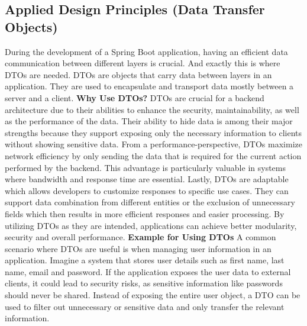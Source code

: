     \subsection{Applied Design Principles (Data Transfer Objects)}
    During the development of a Spring Boot application, having an efficient data communication between different layers is crucial. And exactly this is where DTOs are needed. \newline
    DTOs are objects that carry data between layers in an application. They are used to encapsulate and transport data mostly between a server and a client.
    \newline \newline
    \textbf{Why Use DTOs?} \newline
    DTOs are crucial for a backend architecture due to their abilities to enhance the security, maintainability, as well as the performance of the data. Their ability to hide data is among their major strengths because they support exposing only the necessary information to clients without showing sensitive data. \newline
    From a performance-perspective, DTOs maximize network efficiency by only sending the data that is required for the current action performed by the backend. This advantage is particularly valuable in systems where bandwidth and response time are essential. \newline
    Lastly, DTOs are adaptable which allows developers to customize responses to specific use cases. They can support data combination from different entities or the exclusion of unnecessary fields which then results in more efficient responses and easier processing. \newline
    By utilizing DTOs as they are intended, applications can achieve better modularity, security and overall performance. \newline \newline
    \textbf{Example for Using DTOs} \newline
    A common scenario where DTOs are useful is when managing user information in an application. \newline
    Imagine a system that stores user details such as first name, last name, email and password. If the application exposes the user data to external clients, it could lead to security risks, as sensitive information like passwords should never be shared. Instead of exposing the entire user object, a DTO can be used to filter out unnecessary or sensitive data and only transfer the relevant information. \newline
